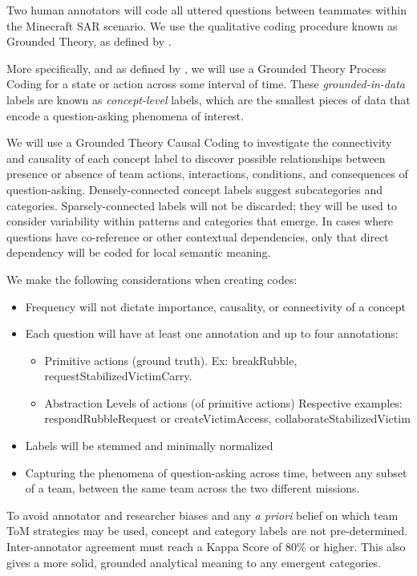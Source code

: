 Two human annotators will code all uttered questions between teammates within the Minecraft SAR scenario.
We use the qualitative coding procedure known as Grounded Theory,
as defined by \citet{corbin_strauss_2015}. 

More specifically, and as defined by \citet{saldana_2021}, we will use a
Grounded Theory Process Coding for a state or action across some interval of
time. These \emph{grounded-in-data} labels are known as \emph{concept-level}
labels, which are the smallest pieces of data that encode a question-asking
phenomena of interest.

We will use a Grounded Theory Causal Coding to investigate the connectivity and
causality of each concept label to discover possible relationships between
presence or absence of team actions, interactions, conditions, and consequences
of question-asking. Densely-connected concept labels suggest subcategories and
categories. Sparsely-connected labels will not be discarded; they will be used
to consider variability within patterns and categories that emerge. In cases
where questions have co-reference or other contextual dependencies, only that
direct dependency will be coded for local semantic meaning.

We make the following considerations when creating codes: 

\begin{itemize}
    \item Frequency will not dictate importance, causality, or connectivity of a concept
    \item Each question will have at least one annotation and up to four
      annotations:
    \begin{itemize}
        \item Primitive actions (ground truth). Ex: breakRubble,
          requestStabilizedVictimCarry.
        \item Abstraction Levels of actions (of primitive actions) Respective
          examples: respondRubbleRequest or createVictimAccess, collaborateStabilizedVictim
    \end{itemize}
    \item Labels will be stemmed and minimally normalized
    \item Capturing the phenomena of question-asking across time, between any subset of a team, between the same team across the two different missions. 
\end{itemize}


To avoid annotator and researcher biases and any \emph{a priori} belief on
which team ToM strategies may be used, concept and category labels are not
pre-determined. Inter-annotator agreement must reach a Kappa Score of 80\% or
higher. This also gives a more solid, grounded analytical meaning to any
emergent categories. 

